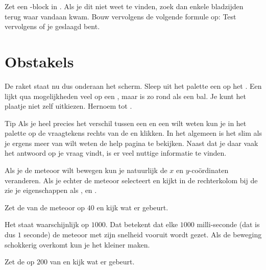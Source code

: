 \begin{opgave}
	\opgVraag
	Zet een -block in . Als je dit niet weet te vinden, zoek dan enkele bladzijden terug waar  vandaan kwam. Bouw vervolgens de volgende formule op:
	Test vervolgens of je geslaagd bent.
\end{opgave}
\runOpTelefoon[-1in]{} 

\section{Obstakels}
De raket staat nu dus onderaan het scherm. Sleep uit het palette  een  op het . Een  lijkt qua mogelijkheden veel op een , maar is zo rond als een bal. Je kunt het plaatje niet zelf uitkiezen. Hernoem  tot .

\begin{derivation}{Tip}
Als je heel precies het verschil tussen een  en een  wilt weten kun je in het palette op de vraagtekens rechts van de  en  klikken. In het algemeen is het slim als je ergens meer van wilt weten de help pagina te bekijken. Naast dat je daar vaak het antwoord op je vraag vindt, is er veel nuttige informatie te vinden.
\end{derivation} 

Als je de meteoor wilt bewegen kun je natuurlijk de $x$ en $y$-co\"ordinaten veranderen. Als je echter de meteoor selecteert en kijkt in de rechterkolom bij de  zie je eigenschappen als ,  en . 

\begin{opgave}
	\opgVraag
	Zet de  van de meteoor op $40$ en kijk wat er gebeurt. 
\end{opgave}
\runOpTelefoon[-1in]{}

Het  staat waarschijnlijk op $1000$. Dat betekent dat elke $1000$ milli-seconde (dat is dus $1$ seconde) de meteoor met zijn snelheid vooruit wordt gezet. Als de beweging schokkerig overkomt kun je het  kleiner maken. 

\begin{opgave}
	\opgVraag
	Zet de  op $200$ van en kijk wat er gebeurt. 
\end{opgave}
\runOpTelefoon[-1in]{}


